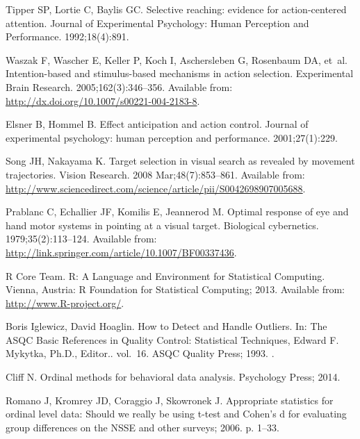 \documentclass[10pt,letterpaper]{article}
\begin{document}
\begin{thebibliography}{10}
Tipper SP, Lortie C, Baylis GC.
\newblock Selective reaching: evidence for action-centered attention.
\newblock Journal of Experimental Psychology: Human Perception and Performance.
  1992;18(4):891.

Waszak F, Wascher E, Keller P, Koch I, Aschersleben G, Rosenbaum DA, et~al.
\newblock Intention-based and stimulus-based mechanisms in action selection.
\newblock Experimental Brain Research. 2005;162(3):346--356.
\newblock Available from: \url{http://dx.doi.org/10.1007/s00221-004-2183-8}.

Elsner B, Hommel B.
\newblock Effect anticipation and action control.
\newblock Journal of experimental psychology: human perception and performance.
  2001;27(1):229.

Song JH, Nakayama K.
\newblock Target selection in visual search as revealed by movement
  trajectories.
\newblock Vision Research. 2008 Mar;48(7):853--861.
\newblock Available from:
  \url{http://www.sciencedirect.com/science/article/pii/S0042698907005688}.

Prablanc C, Echallier JF, Komilis E, Jeannerod M.
\newblock Optimal response of eye and hand motor systems in pointing at a
  visual target.
\newblock Biological cybernetics. 1979;35(2):113--124.
\newblock Available from:
  \url{http://link.springer.com/article/10.1007/BF00337436}.

{R Core Team}.
\newblock R: {A} {Language} and {Environment} for {Statistical} {Computing}.
\newblock Vienna, Austria: R Foundation for Statistical Computing; 2013.
\newblock Available from: \url{http://www.R-project.org/}.

{Boris Iglewicz}, {David Hoaglin}.
\newblock How to {Detect} and {Handle} {Outliers}.
\newblock In: The {ASQC} {Basic} {References} in {Quality} {Control}:
  {Statistical} {Techniques}, {Edward} {F}. {Mykytka}, {Ph}.{D}., {Editor}..
  vol.~16. ASQC Quality Press; 1993. .

Cliff N.
\newblock Ordinal methods for behavioral data analysis.
\newblock Psychology Press; 2014.

Romano J, Kromrey JD, Coraggio J, Skowronek J.
\newblock Appropriate statistics for ordinal level data: {Should} we really be
  using t-test and {Cohen}’s d for evaluating group differences on the {NSSE}
  and other surveys; 2006. p. 1--33.


\end{thebibliography}
\end{document}
